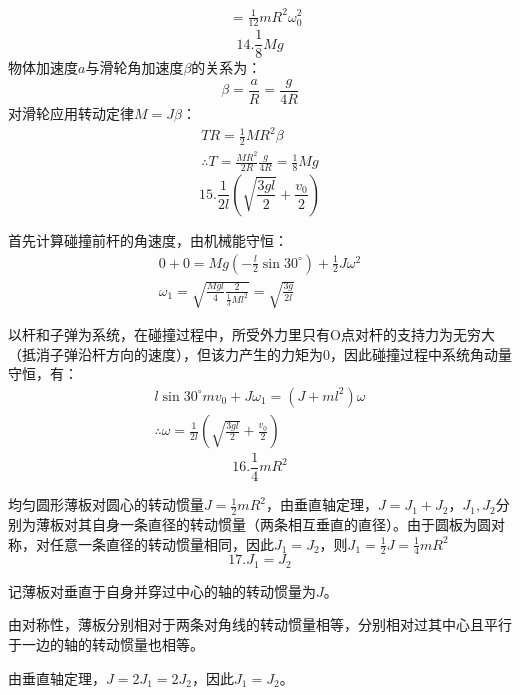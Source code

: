 \documentclass[blue, normal]{./templete/qyxfnote}
\begin{document}
\begin{multicols}{2}
\begin{align*}
			&=\frac{1}{12}mR^2\omega_0^2
			\end{align*}
			\[14.\frac{1}{8}Mg\]
			物体加速度$ a $与滑轮角加速度$ \beta $的关系为：
			\[\beta=\frac{a}{R}=\frac{g}{4R}\]
			对滑轮应用转动定律$M=J\beta$：
			\begin{gather*}
			TR=\frac{1}{2}MR^2\beta\\
			\therefore T=\frac{MR^2}{2R}\frac{g}{4R}=\frac{1}{8}Mg
			\end{gather*}
			\[15.\frac{1}{2l}\left(\sqrt{\frac{3gl}{2}}+\frac{v_0}{2}\right)\]\par
			首先计算碰撞前杆的角速度，由机械能守恒：
			\begin{gather*}
			0+0=Mg(-\frac{l}{2}\sin 30^\circ)+\frac{1}{2}J\omega^2\\
			\omega_1=\sqrt{\frac{Mgl}{4}\frac{2}{\frac{1}{3}Ml^2}}=\sqrt{\frac{3g}{2l}}
			\end{gather*}\par
			以杆和子弹为系统，在碰撞过程中，所受外力里只有O点对杆的支持力为无穷大（抵消子弹沿杆方向的速度），但该力产生的力矩为0，因此碰撞过程中系统角动量守恒，有：
			\begin{gather*}
			l\sin 30^\circ mv_0+J\omega_1=(J+ml^2)\omega\\
			\therefore \omega=\frac{1}{2l}\left(\sqrt{\frac{3gl}{2}}+\frac{v_0}{2}\right)
			\end{gather*}
			\[16.\frac{1}{4}mR^2 \]\par		
			均匀圆形薄板对圆心的转动惯量$ J=\frac{1}{2}mR^2 $，由垂直轴定理，$ J=J_1+J_2 $，$ J_1,J_2 $分别为薄板对其自身一条直径的转动惯量（两条相互垂直的直径）。由于圆板为圆对称，对任意一条直径的转动惯量相同，因此$ J_1=J_2 $，则$ J_1=\frac{1}{2}J=\frac{1}{4}mR^2 $
			\[17.J_1=J_2\]\par
			记薄板对垂直于自身并穿过中心的轴的转动惯量为$ J $。\par
			由对称性，薄板分别相对于两条对角线的转动惯量相等，分别相对过其中心且平行于一边的轴的转动惯量也相等。\par
			\par
			由垂直轴定理，$ J=2J_1=2J_2 $，因此$ J_1=J_2 $。

\end{multicols}
\end{document}
